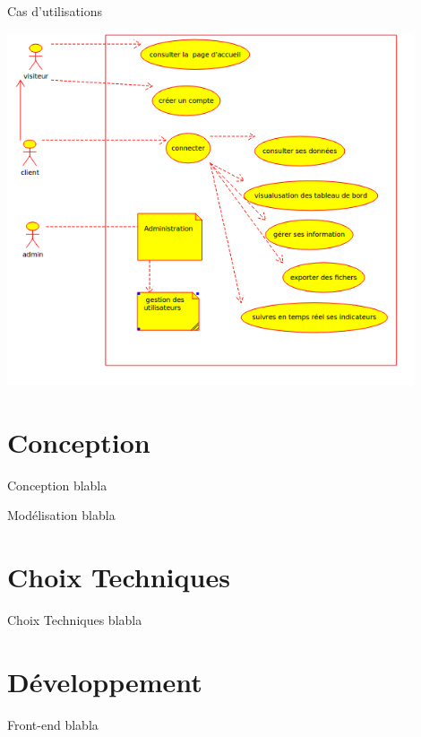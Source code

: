 \documentclass[french]{beamer}
\begin{document}
\begin{frame}{Cas d'utilisations}
\begin{center}


\includegraphics[width=0.9\textwidth]{cd2.png}
\end{center}

\end{frame}


\section{Conception}
\begin{frame}{Conception}
	blabla
\end{frame}


\begin{frame}{Modélisation}
	blabla
\end{frame}

\section{Choix Techniques}
\begin{frame}{Choix Techniques}
	blabla
\end{frame}


\section{Développement}
\begin{frame}{Front-end}
	blabla
\end{frame}
\end{document}
